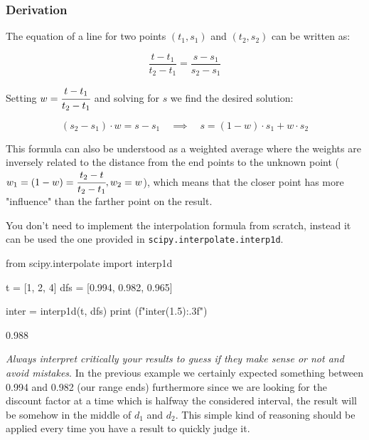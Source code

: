 \begin{attention}
\subsubsection{Derivation}
The equation of a line for two points $(t_1, s_1)$ and $(t_2, s_2)$ can be written as:

\begin{equation}
\frac{t - t_1}{t_2 - t_1} = \frac{s - s_1}{s_2 - s_1}
\end{equation}

Setting $w = \cfrac{t - t_1}{t_2 - t_1}$ and solving for $s$ we find the desired solution:

\begin{equation}
(s_2 - s_1)\cdot w = s - s_1\quad\implies\quad s = (1 - w)\cdot s_1 + w \cdot s_2
\end{equation}

This formula can also be understood as a weighted average where the weights are inversely related to the distance from the end points to the unknown point ($w_1 = (1 - w) = \cfrac{t_2 - t}{t_2 -t_1}, w_2 = w$), which means that the closer point has more "influence" than the farther point on the result.
\end{attention}

You don't need to implement the interpolation formula from scratch, instead it can be used the one provided in \texttt{scipy.interpolate.interp1d}. 


\begin{ipython}
from scipy.interpolate import interp1d

t = [1, 2, 4]
dfs = [0.994, 0.982, 0.965]

inter = interp1d(t, dfs)	
print (f"{inter(1.5):.3f}")
\end{ipython}
\begin{ioutput}
0.988
\end{ioutput}

\emph{Always interpret critically your results to guess if they make sense or not and avoid mistakes}. In the previous example we certainly expected something between 0.994 and 0.982 (our range ends) furthermore since we are looking for the discount factor at a time which is halfway the considered interval, the result will be somehow in the middle of $d_1$ and $d_2$. This simple kind of reasoning should be applied every time you have a result to quickly judge it.

